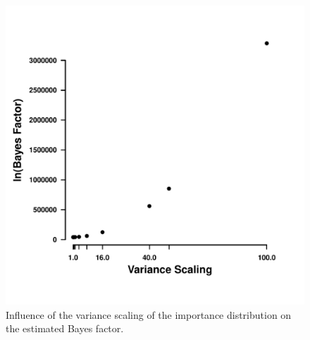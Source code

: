 \documentclass[fleqn,letterpaper]{article}
\begin{document}
\null
\vfill
\clearpage
\null
\vfill
\begin{figure}
     \centering
	\includegraphics[width=.5\textwidth]{img/bf_variance_scaling.pdf}
	\caption{Influence of the variance scaling of the importance distribution on the estimated Bayes factor.}
	\label{fig:bf_scaling}
\end{figure}
\null
\vfill
\clearpage
\end{document}
